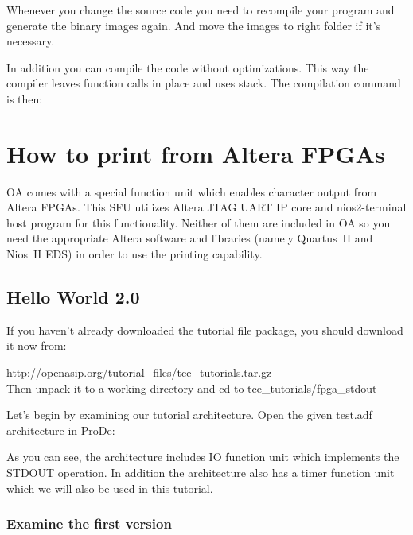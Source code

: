 \documentclass[a4paper,twoside]{tceusermanual}
\begin{document}
Whenever you change the source code you need to recompile your program and
generate the binary images again. And move the images to right folder if it's
necessary.

In addition you can compile the code without optimizations. This way the
compiler leaves function calls in place and uses stack. The compilation
command is then:





\section{How to print from Altera FPGAs}

OA comes with a special function unit which enables character output
from Altera FPGAs. This SFU utilizes Altera JTAG UART IP core and
nios2-terminal host program for this functionality. Neither of them
are included in OA so you need the appropriate Altera software and
libraries (namely Quartus~II and Nios~II EDS) in order to use the
printing capability.

\subsection{Hello World 2.0}

If you haven't already downloaded the tutorial file package, you should
download it now from:

\url{http://openasip.org/tutorial_files/tce_tutorials.tar.gz}\\

Then unpack it to a working directory and cd to tce\_tutorials/fpga\_stdout

Let's begin by examining our tutorial architecture. Open the given test.adf
architecture in ProDe:


As you can see, the architecture includes IO function unit which implements the
STDOUT operation. In addition the architecture also has a timer function unit
which we will also be used in this tutorial.

\subsubsection{Examine the first version}
\end{document}

